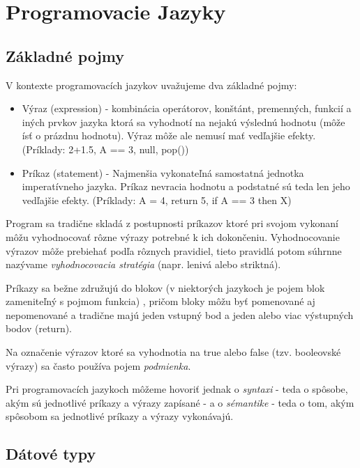 \documentclass[a4paper,10pt]{article}
\begin{document}
\section{Programovacie Jazyky}

\begin{multicols}{2}

\subsection{Základné pojmy}

	V kontexte programovacích jazykov uvažujeme dva základné pojmy:
	
	\begin{itemize}
		\item Výraz (expression) - kombinácia operátorov, konštánt, premenných, funkcií a iných prvkov jazyka ktorá sa vyhodnotí na nejakú výslednú hodnotu (môže ísť o prázdnu hodnotu). Výraz môže ale nemusí mať vedľajšie efekty. (Príklady: 2+1.5, A == 3, null, pop())
		\item Príkaz (statement) - Najmenšia vykonateľná samostatná jednotka imperatívneho jazyka. Príkaz nevracia hodnotu a podstatné sú teda len jeho vedľajšie efekty. (Príklady: A = 4, return 5, if A == 3 then X)
	\end{itemize}
	
	Program sa tradične skladá z postupnosti príkazov ktoré pri svojom vykonaní môžu vyhodnocovať rôzne výrazy potrebné k ich dokončeniu. Vyhodnocovanie výrazov môže prebiehať podľa rôznych pravidiel, tieto pravidlá potom súhrnne nazývame \emph{vyhodnocovacia stratégia} (napr. lenivá alebo striktná).

	Príkazy sa bežne združujú do blokov (v niektorých jazykoch je pojem blok zameniteľný s pojmom funkcia)	, pričom bloky môžu byť pomenované aj nepomenované a tradične majú jeden vstupný bod a jeden alebo viac výstupných bodov (return).
	
	Na označenie výrazov ktoré sa vyhodnotia na true alebo false (tzv. booleovské výrazy) sa často používa pojem \emph{podmienka}.
	
	Pri programovacích jazykoch môžeme hovoriť jednak o \emph{syntaxi} - teda o spôsobe, akým sú jednotlivé príkazy a výrazy zapísané - a o \emph{sémantike} - teda o tom, akým spôsobom sa jednotlivé príkazy a výrazy vykonávajú.	
	
\subsection{Dátové typy}


\end{multicols}
\end{document}
